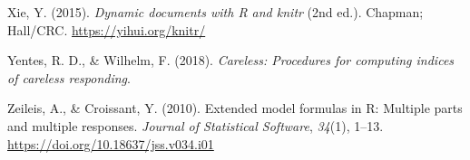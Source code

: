 \documentclass[
  english,
  man, noextraspace]{apa7}
\begin{document}
\begin{appendix}
\leavevmode\hypertarget{ref-R-knitr}{}%
Xie, Y. (2015). \emph{Dynamic documents with R and knitr} (2nd ed.).
Chapman; Hall/CRC. \url{https://yihui.org/knitr/}

\leavevmode\hypertarget{ref-R-careless}{}%
Yentes, R. D., \& Wilhelm, F. (2018). \emph{Careless: Procedures for
computing indices of careless responding}.

\leavevmode\hypertarget{ref-R-Formula}{}%
Zeileis, A., \& Croissant, Y. (2010). Extended model formulas in R:
Multiple parts and multiple responses. \emph{Journal of Statistical
Software}, \emph{34}(1), 1--13.
\url{https://doi.org/10.18637/jss.v034.i01}

\endgroup
\end{appendix}
\end{document}
